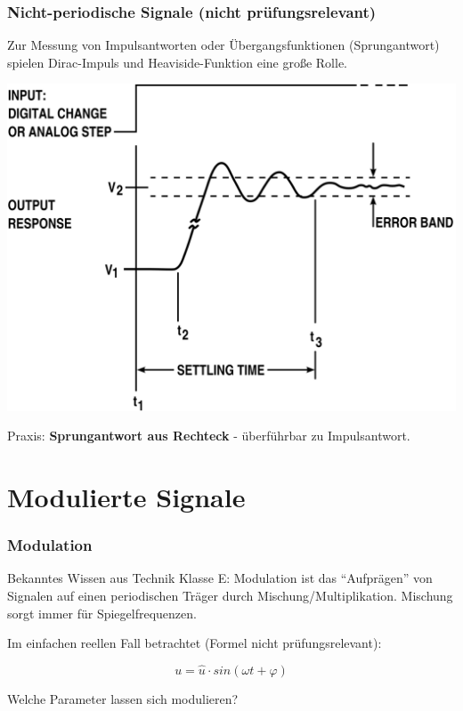 \begin{frame}
  \frametitle{Nicht-periodische Signale (nicht prüfungsrelevant)}

  Zur Messung von Impulsantworten oder Übergangsfunktionen (Sprungantwort)
  spielen Dirac-Impuls und Heaviside-Funktion eine große Rolle. \\[2em]

  \begin{center}
    \includegraphics[width=\textwidth,height=0.5\textheight,keepaspectratio]{a11/High_accuracy_settling_time_measurements_figure_1.png}
    \tiny \hyperlink{refs}{\cite{wc}}
  \end{center}

  Praxis: \textbf{Sprungantwort aus Rechteck} - überführbar zu Impulsantwort.

\end{frame}

\section{Modulierte Signale}

\begin{frame}
  \frametitle{Modulation}

  \begin{block}{Bekanntes Wissen aus Technik Klasse E:} %
    Modulation ist das "`Aufprägen"' von Signalen auf einen periodischen Träger
    durch Mischung/Multiplikation. Mischung sorgt immer für Spiegelfrequenzen.
  \end{block}

  \bigskip Im einfachen reellen Fall betrachtet (Formel nicht prüfungsrelevant):

  \begin{equation*}
    u = \hat{u} \cdot sin(\omega t + \varphi)
  \end{equation*}

  \vspace{2em}
  Welche Parameter lassen sich modulieren?

\end{frame}

